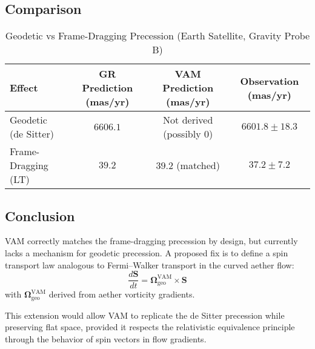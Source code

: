 \subsection*{Comparison}

\begin{table}[h!]
    \centering
    \caption{Geodetic vs Frame-Dragging Precession (Earth Satellite, Gravity Probe B)}
    \label{tab:geodetic}
    \begin{tabular}{lccc}
        \toprule
        Effect & GR Prediction (mas/yr) & VAM Prediction (mas/yr) & Observation (mas/yr) \\
        \midrule
        Geodetic (de Sitter) & $6606.1$ & Not derived (possibly $0$) & $6601.8 \pm 18.3$ \\
        Frame-Dragging (LT)  & $39.2$   & $39.2$ (matched)           & $37.2 \pm 7.2$ \\
        \bottomrule
    \end{tabular}
\end{table}

\subsection*{Conclusion}

VAM correctly matches the frame-dragging precession by design, but currently lacks a mechanism for geodetic precession. A proposed fix is to define a spin transport law analogous to Fermi--Walker transport in the curved aether flow:
\begin{equation}
    \frac{d\mathbf{S}}{dt} = \boldsymbol{\Omega}_{\text{geo}}^{\text{VAM}} \times \mathbf{S}
\end{equation}
with $\boldsymbol{\Omega}_{\text{geo}}^{\text{VAM}}$ derived from aether vorticity gradients.

This extension would allow VAM to replicate the de Sitter precession while preserving flat space, provided it respects the relativistic equivalence principle through the behavior of spin vectors in flow gradients.